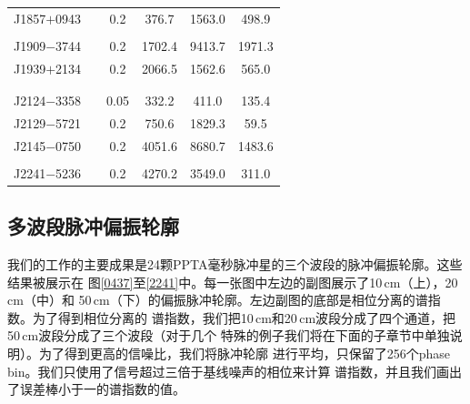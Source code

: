 \begin{table}
\begin{tabular}{lccccc}
J1857$+$0943 & \cite{Thorsett90,Xilouris98}       & 0.2   &      376.7 	 &    1563.0  	&      498.9    \\  
             & \cite{Ord04,Yan11a}                 &       &               &              &               \\  
J1909$-$3744 & \cite{Ord04,Yan11a}                 & 0.2   &     1702.4 	 &    9413.7  	&     1971.3    \\  
J1939$+$2134 & \cite{Thorsett90,Xilouris98}       & 0.2   &     2066.5 	 &    1562.6  	&      565.0    \\  
             & \cite{Stairs99,Ord04,Yan11a}        &       &               &              &               \\
             &                                    &       &               &              &               \\
J2124$-$3358 & \cite{Manchester04,Ord04,Yan11a}    & 0.05  &      332.2 	 &     411.0  	&      135.4    \\  
J2129$-$5721 & \cite{Manchester04,Ord04,Yan11a}    & 0.2   &      750.6 	 &    1829.3  	&       59.5    \\  
J2145$-$0750 & \cite{Xilouris98,Stairs99}         & 0.2   &     4051.6 	 &    8680.7  	&     1483.6    \\  
             & \cite{Manchester04,Ord04,Yan11a}    &       &               &              &               \\
J2241$-$5236 & \cite{Keith11}                     & 0.2   &     4270.2 	 &    3549.0  	&      311.0    \\
\hline
\end{tabular}
\end{table}

\subsection{多波段脉冲偏振轮廓}

我们的工作的主要成果是24颗PPTA毫秒脉冲星的三个波段的脉冲偏振轮廓。这些结果被展示在
图\ref{0437}至\ref{2241}中。每一张图中左边的副图展示了10\,cm（上），20\,cm（中）和
50\,cm（下）的偏振脉冲轮廓。左边副图的底部是相位分离的谱指数。为了得到相位分离的
谱指数，我们把10\,cm和20\,cm波段分成了四个通道，把50\,cm波段分成了三个波段（对于几个
特殊的例子我们将在下面的子章节中单独说明）。为了得到更高的信噪比，我们将脉冲轮廓
进行平均，只保留了256个phase bin。我们只使用了信号超过三倍于基线噪声的相位来计算
谱指数，并且我们画出了误差棒小于一的谱指数的值。


